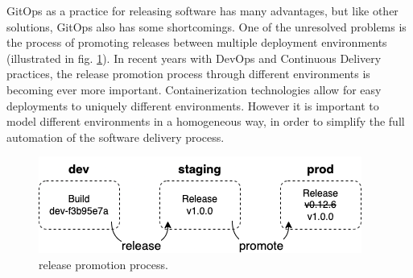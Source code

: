%


\noindent
GitOps as a practice for releasing software has many advantages,
but like other solutions, GitOps also has some shortcomings.
One of the unresolved problems is
the process of promoting releases between multiple deployment environments (illustrated in fig. \ref{fig:releasePromotionProcess}).
In recent years with DevOps and Continuous Delivery practices,
the release promotion process through different environments is becoming ever more important.
Containerization technologies allow for easy deployments to
uniquely different environments.
However it is important to model different environments in
a homogeneous way,
in order to simplify the full automation of the software delivery process.

\begin{figure}[h]
	\centering
	\includegraphics[width=.55\linewidth]{figures/release-promotion.drawio.png}
	\caption{release promotion process.
	}
	\label{fig:releasePromotionProcess}	
\end{figure}

